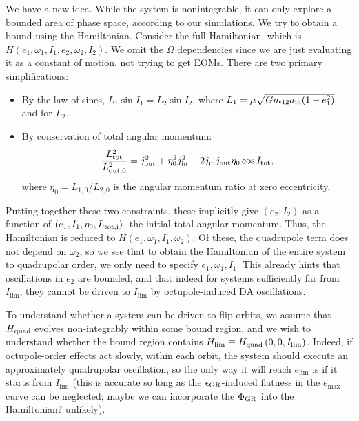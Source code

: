 \documentclass[11pt,
        usenames, %
        dvipsnames %
    ]{article}
\newcommand*{\p}[1]{\left(#1\right)}
\begin{document}
We have a new idea. While the system is nonintegrable, it can only explore a
bounded area of phase space, according to our simulations. We try to obtain a
bound using the Hamiltonian. Consider the full Hamiltonian, which is $H\p{e_1,
\omega_1, I_1, e_2, \omega_2, I_2}$. We omit the $\Omega$ dependencies since we
are just evaluating it as a constant of motion, not trying to get EOMs. There
are two primary simplifications:
\begin{itemize}
    \item By the law of sines, $L_1 \sin I_1 = L_2 \sin I_2$, where $L_1 =
        \mu\sqrt{Gm_{12}a_{\rm in}(1 - e_1^2)}$ and for $L_2$.

    \item By conservation of total angular momentum:
        \begin{equation}
            \frac{L_{\rm tot}^2}{L_{\rm out, 0}^2}
                = j_{\rm out}^2 + \eta_0^2 j_{\rm in}^2
                    + 2j_{\rm in} j_{\rm out} \eta_0 \cos I_{\rm tot},
        \end{equation}
        where $\eta_0 = L_{1,0} / L_{2,0}$ is the angular momentum ratio at zero
        eccentricity.
\end{itemize}
Putting together these two constraints, these implicitly give $(e_2, I_2)$ as a
function of $\p{e_1, I_1, \eta_0, L_{\rm tot, i}}$, the initial total angular
momentum. Thus, the Hamiltonian is reduced to $H\p{e_1, \omega_1, I_1,
\omega_2}$. Of these, the quadrupole term does not depend on $\omega_2$, so we
see that to obtain the Hamiltonian of the entire system to quadrupolar order, we
only need to specify $e_1, \omega_1, I_1$. This already hints that oscillations
in $e_2$ are bounded, and that indeed for systems sufficiently far from
$I_{\lim}$, they cannot be driven to $I_{\lim}$ by octupole-induced DA
oscillations.

To understand whether a system can be driven to flip orbits, we assume that
$H_{\rm quad}$ evolves non-integrably within some bound region, and we wish to
understand whether the bound region contains $H_{\lim} \equiv H_{\rm quad}\p{0,
0, I_{\lim}}$. Indeed, if octupole-order effects act slowly, within each orbit,
the system should execute an approximately quadrupolar oscillation, so the only
way it will reach $e_{\lim}$ is if it starts from $I_{\lim}$ (this is accurate
so long as the $\epsilon_{\rm GR}$-induced flatness in the $e_{\max}$ curve can
be neglected; maybe we can incorporate the $\Phi_{\rm GR}$ into the Hamiltonian?
unlikely).
\end{document}
